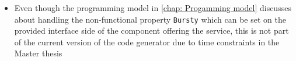 \begin{itemize}
\item Even though the programming model in \cref{chap: Progamming model} discusses about handling the non-functional property \texttt{Bursty} which can be set on the provided interface side of the component offering the service, this is not part of the current version of the code generator due to time constraints in the Master thesis       
\end{itemize} 
\label{section: Future work}

